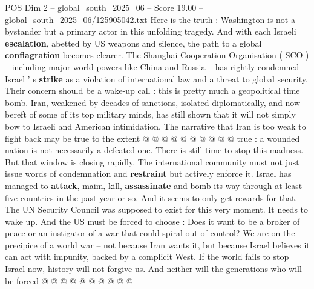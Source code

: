 \begin{textsample}{POS Dim 2 – global\_south\_2025\_06 – Score 19.00 – global\_south\_2025\_06/125905042.txt}
Here is the truth : Washington is not a bystander but a primary actor in this unfolding tragedy.
And with each Israeli \textbf{escalation}, abetted by US weapons and silence, the path to a global \textbf{conflagration} becomes clearer.
The Shanghai Cooperation Organisation ( SCO ) -- including major world powers like China and Russia -- has rightly condemned Israel ' s \textbf{strike} as a violation of international law and a threat to global security.
Their concern should be a wake-up call : this is pretty much a geopolitical time bomb.
Iran, weakened by decades of sanctions, isolated diplomatically, and now bereft of some of its top military minds, has still shown that it will not simply bow to Israeli and American intimidation.
The narrative that Iran is too weak to fight back may be true to the extent @ @ @ @ @ @ @ @ @ @ true : a wounded nation is not necessarily a defeated one.
There is still time to stop this madness.
But that window is closing rapidly.
The international community must not just issue words of condemnation and \textbf{restraint} but actively enforce it.
Israel has managed to \textbf{attack}, maim, kill, \textbf{assassinate} and bomb its way through at least five countries in the past year or so.
And it seems to only get rewards for that.
The UN Security Council was supposed to exist for this very moment.
It needs to wake up.
And the US must be forced to choose : Does it want to be a broker of peace or an instigator of a war that could spiral out of control?
We are on the precipice of a world war -- not because Iran wants it, but because Israel believes it can act with impunity, backed by a complicit West.
If the world fails to stop Israel now, history will not forgive us.
And neither will the generations who will be forced @ @ @ @ @ @ @ @ @ @

\end{textsample}
